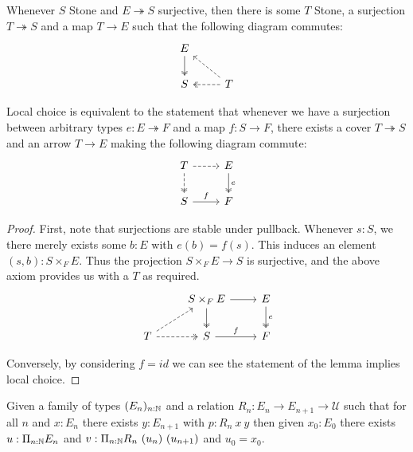 \begin{axiomNum}
  Whenever $S$ Stone and $E\twoheadrightarrow S$ surjective, then there is some $T$ Stone,
    a surjection $T \twoheadrightarrow S$ and a map $T\to E$ 
    such that the following diagram commutes:
    \begin{equation}\begin{tikzcd}
      E \arrow[d,""',two heads]\\
      S & \arrow[l, "", two heads, dashed] T\arrow[lu, ""',dashed ]
    \end{tikzcd}\end{equation}  
\end{axiomNum} 

\begin{lemma}
  Local choice is equivalent to the statement that whenever 
  we have a surjection  between arbitrary types $e:E \twoheadrightarrow F$  and  
  a map $f:S\to F$, there exists a cover $T\twoheadrightarrow S$ and an arrow $T\to E$ making the following diagram commute:
    \begin{equation}\begin{tikzcd}
      T \arrow[d,dashed, two heads ] \arrow[r,dashed]&  E \arrow[d,""',two heads, "e"]\\
      S  \arrow[r, "f"] & F
    \end{tikzcd}\end{equation}  
\end{lemma}
\begin{proof}
  First, note that surjections are stable under pullback.
  Whenever $s:S$, we there merely exists some $b:E$ with $e(b) = f(s)$. 
  This induces an element $(s,b):S\times_F E$. 
  Thus the projection $S\times_F E \to S$ is surjective, and 
  the above axiom provides us with a $T$ as required. 
    \begin{equation}\begin{tikzcd}
     & S \times_F E \arrow[r] \arrow[d,two heads] &  E \arrow[d,""',two heads, "e"]\\
       T \arrow[r, two heads ,dashed ] \arrow[ru,dashed]& 
       S  \arrow[r, "f"] & F
    \end{tikzcd}\end{equation}  
    
    Conversely, by considering $f=id$ we can see the statement of the lemma implies local choice. 
\end{proof}

\begin{axiomNum}\label{axDependentChoice}
  Given a family of types $(E_n)_{n:\mathbb{N}}$ and 
  a relation 
  $R_n:E_n\rightarrow E_{n+1}\rightarrow {\mathcal U}$ such that
  for all $n$ and $x:E_n$ there exists $y:E_{n+1}$ with $p:R_n~x~y$ 
  then given $x_0:E_0$ there exists
  $u:\Pi_{n:\mathbb{N}}E_n$ and $v:\Pi_{n:\mathbb{N}}R_n~(u_n)~(u_{n+1})$ and $u_0 = x_0$.
\end{axiomNum}

